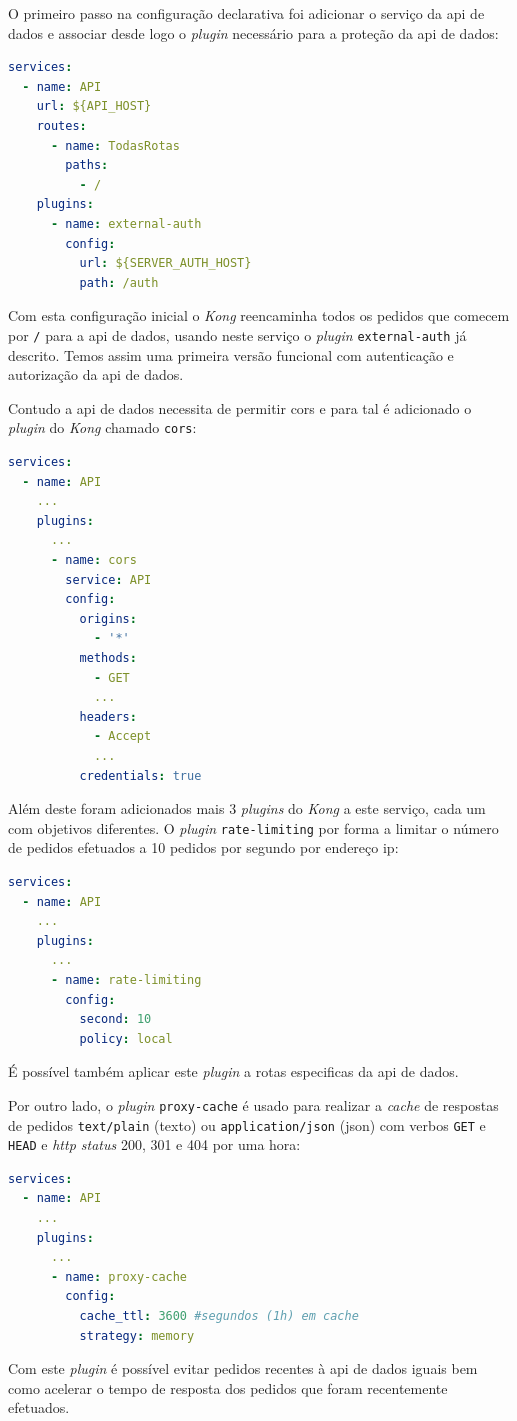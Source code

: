 O primeiro passo na configuração declarativa foi adicionar o serviço da \acrshort{api} de dados e associar desde logo o \textit{plugin} necessário para a proteção da \acrshort{api} de dados:
\begin{lstlisting}[language=yaml, caption=Configuração declarativa do \textit{Kong}: \acrshort{api} de dados]
services:
  - name: API
    url: ${API_HOST}
    routes:
      - name: TodasRotas
        paths:
          - /
    plugins:
      - name: external-auth
        config:
          url: ${SERVER_AUTH_HOST}
          path: /auth
\end{lstlisting}

Com esta configuração inicial o \textit{Kong} reencaminha todos os pedidos que comecem por \texttt{/} para a \acrshort{api} de dados, usando neste serviço o \textit{plugin} \texttt{external-auth} já descrito. Temos assim uma primeira versão funcional com autenticação e autorização da \acrshort{api} de dados.

Contudo a \acrshort{api} de dados necessita de permitir \acrshort{cors} e para tal é adicionado o \textit{plugin} do \textit{Kong} chamado \texttt{cors}\cite{kongCORS}:
\begin{lstlisting}[language=yaml, caption=Configuração declarativa do \textit{Kong}: \textit{plugin} \texttt{cors}]
services:
  - name: API
    ...
    plugins:
      ...
      - name: cors
        service: API
        config:
          origins:
            - '*'
          methods:
            - GET
            ...
          headers:
            - Accept
            ...
          credentials: true
\end{lstlisting}
Além deste foram adicionados mais 3 \textit{plugins} do \textit{Kong} a este serviço, cada um com objetivos diferentes. O \textit{plugin} \texttt{rate-limiting} por forma a limitar o número de pedidos efetuados a 10 pedidos por segundo por endereço \acrshort{ip}\cite{kongRateLimiting}:
\begin{lstlisting}[language=yaml, caption=Configuração declarativa do \textit{Kong}: \textit{plugin} \texttt{rate-limiting}]
services:
  - name: API
    ...
    plugins:
      ...
      - name: rate-limiting
        config:
          second: 10
          policy: local
\end{lstlisting}
É possível também aplicar este \textit{plugin} a rotas especificas da \acrshort{api} de dados.

Por outro lado, o \textit{plugin} \texttt{proxy-cache} é usado para realizar a \textit{cache} de respostas de pedidos \texttt{text/plain} (texto) ou \texttt{application/json} (\acrshort{json}) com verbos \texttt{GET} e \texttt{HEAD} e \textit{\acrshort{http} status} 200, 301 e 404 por uma hora\cite{kongProxyCache}:
\begin{lstlisting}[language=yaml, caption=Configuração declarativa do \textit{Kong}: \textit{plugin} \texttt{proxy-cache}]
services:
  - name: API
    ...
    plugins:
      ...
      - name: proxy-cache
        config:
          cache_ttl: 3600 #segundos (1h) em cache
          strategy: memory
\end{lstlisting}
Com este \textit{plugin} é possível evitar pedidos recentes à \acrshort{api} de dados iguais bem como acelerar o tempo de resposta dos pedidos que foram recentemente efetuados.

